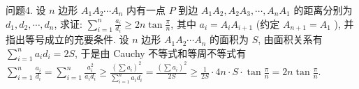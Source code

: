 问题4. 设 $n$ 边形 $A_1 A_2 \cdots A_n$ 内有一点 $P$ 到边 $A_1 A_2, A_2 A_3, \cdots, A_n A_1$ 的距离分别为 $d_1, d_2, \cdots, d_n$, 求证: $\sum_{i=1}^n \frac{a_i}{d_i} \geqslant 2 n \tan \frac{\pi}{n}$, 其中 $a_i=A_i A_{i+1}$ (约定 $A_{n+1}=A_1$ ), 并指出等号成立的充要条件.
设 $n$ 边形 $A_1 A_2 \cdots A_n$ 的面积为 $S$, 由面积关系有 $\sum_{i=1}^n a_i d_i=2 S$, 于是由 Cauchy 不等式和等周不等式有 $\sum_{i=1}^n \frac{a_i}{d_i}=\sum_{i=1}^n \frac{a_i^2}{a_i d_i} \geqslant \frac{\left(\sum a_i\right)^2}{\sum_{i=1}^n a_i d_i}=\frac{\left(\sum a_i\right)^2}{2 S} \geqslant \frac{1}{2 S} \cdot 4 n \cdot S \cdot \tan \frac{\pi}{n}=2 n \tan \frac{\pi}{n}$.


